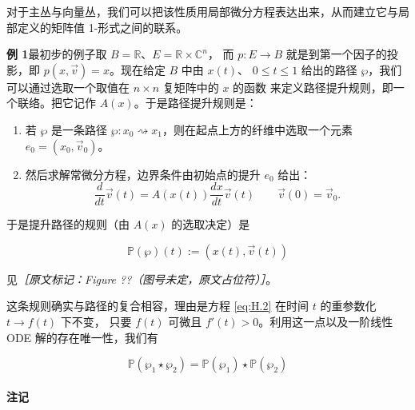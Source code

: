 
对于主丛与向量丛，我们可以把该性质用局部微分方程表达出来，从而建立它与局部定义的矩阵值
1-形式之间的联系。

\textbf{例 1}\quad 最初步的例子取 $B=\mathbb{R}$、$E=\mathbb{R}\times\mathbb{C}^n$，
而 $p:E\to B$ 就是到第一个因子的投影，即 $p(x,\vec{v})=x$。现在给定 $B$ 中由 $x(t)$、
$0\le t\le 1$ 给出的路径 $\wp$，我们可以通过选取一个取值在 $n\times n$ 复矩阵中的 $x$ 的函数
来定义路径提升规则，即一个联络。把它记作 $A(x)$。于是路径提升规则是：

\begin{enumerate}
  \item 若 $\wp$ 是一条路径 $\wp: x_0\rightsquigarrow x_1$，则在起点上方的纤维中选取一个元素
    $e_0=(x_0,\vec{v}_0)$。

  \item 然后求解常微分方程，边界条件由初始点的提升 $e_0$ 给出：
    \begin{equation}
      \frac{d}{dt}\vec{v}(t) = A(x(t))\frac{dx}{dt}\vec{v}(t)
      \qquad \vec{v}(0)=\vec{v}_0.
      \tag{H.2}
      \label{eq:H.2}
    \end{equation}
\end{enumerate}

于是提升路径的规则（由 $A(x)$ 的选取决定）是

\begin{equation}
  \mathbb{P}(\wp)(t) := (x(t),\vec{v}(t))
  \tag{H.3}
  \label{eq:H.3}
\end{equation}

见{\small\itshape ［原文标记：Figure ??（图号未定，原文占位符）］}。


这条规则确实与路径的复合相容，理由是方程 \eqref{eq:H.2} 在时间 $t$ 的重参数化 $t\to f(t)$ 下不变，
只要 $f(t)$ 可微且 $f'(t)>0$。利用这一点以及一阶线性 ODE 解的存在唯一性，我们有

\begin{equation}
  \mathbb{P}(\wp_1\star\wp_2) = \mathbb{P}(\wp_1)\star\mathbb{P}(\wp_2)
  \tag{H.4}
  \label{eq:H.4}
\end{equation}

\paragraph{注记}

